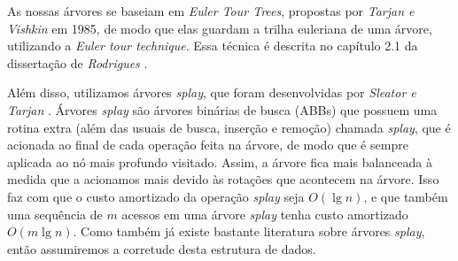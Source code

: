 As nossas árvores se baseiam em \textit{Euler Tour Trees}, propostas por \textit{Tarjan e Vishkin} \cite{tarjan} em 1985, de modo que elas guardam a trilha euleriana de uma árvore, utilizando a \textit{Euler tour technique}. Essa técnica é descrita no capítulo 2.1 da dissertação de \textit{Rodrigues} \cite{arthur}.   

Além disso, utilizamos árvores \textit{splay}, que foram desenvolvidas por \textit{Sleator e Tarjan} \cite{sleator}. Árvores \textit{splay} são árvores binárias de busca (ABBs) que possuem uma rotina extra (além das usuais de busca, inserção e remoção) chamada \textit{splay}, que é acionada ao final de cada operação feita na árvore, de modo que é sempre aplicada ao nó mais profundo visitado. Assim, a árvore fica mais balanceada à medida que a acionamos mais devido às rotações que acontecem na árvore. Isso faz com que o custo amortizado da operação \textit{splay} seja $O(\lg n)$, e que também uma sequência de $m$ acessos em uma árvore \textit{splay} tenha custo amortizado $O(m \lg n)$.  Como também já existe bastante literatura sobre árvores \textit{splay}, então assumiremos a corretude desta estrutura de dados.  
